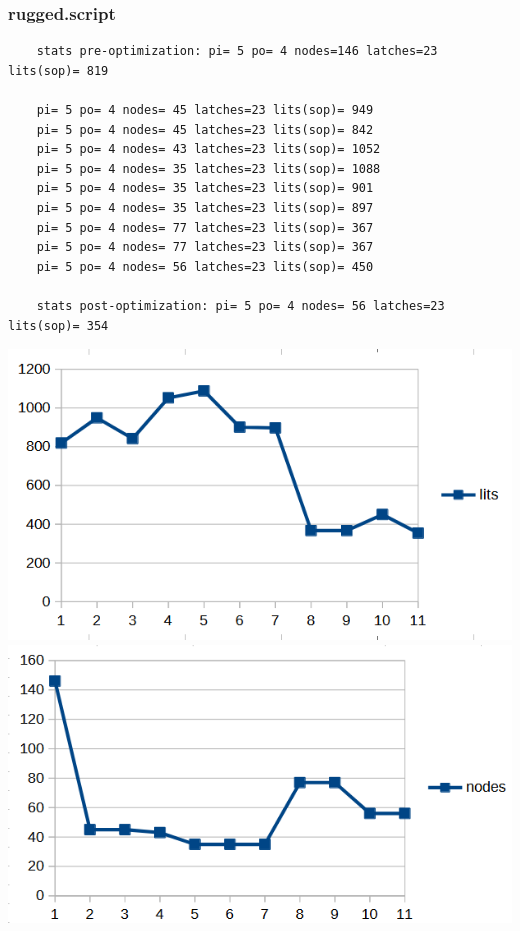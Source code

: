 \documentclass[a4paper,11pt]{article}
\begin{document}
\subsubsection{rugged.script}
    \begin{verbatim}
    stats pre-optimization: pi= 5 po= 4 nodes=146 latches=23 lits(sop)= 819
    
    pi= 5 po= 4 nodes= 45 latches=23 lits(sop)= 949
    pi= 5 po= 4 nodes= 45 latches=23 lits(sop)= 842
    pi= 5 po= 4 nodes= 43 latches=23 lits(sop)= 1052
    pi= 5 po= 4 nodes= 35 latches=23 lits(sop)= 1088
    pi= 5 po= 4 nodes= 35 latches=23 lits(sop)= 901
    pi= 5 po= 4 nodes= 35 latches=23 lits(sop)= 897
    pi= 5 po= 4 nodes= 77 latches=23 lits(sop)= 367
    pi= 5 po= 4 nodes= 77 latches=23 lits(sop)= 367
    pi= 5 po= 4 nodes= 56 latches=23 lits(sop)= 450
    
    stats post-optimization: pi= 5 po= 4 nodes= 56 latches=23 lits(sop)= 354
    \end{verbatim}
    \begin{center}
        \includegraphics[width=0.6\linewidth]{assets/Charts/RuggedL.png}
        \includegraphics[width=0.6\linewidth]{assets/Charts/RuggedN.png}
    \end{center}

\newpage
\end{document}
